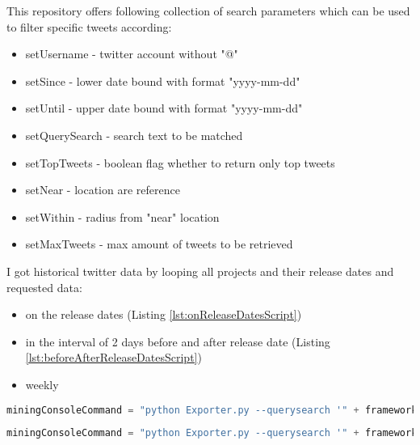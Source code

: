 This repository offers following collection of search parameters which can be used to filter specific tweets according:
\begin{itemize}
  \item setUsername - twitter account without "@"
  \item setSince - lower date bound with format "yyyy-mm-dd"
  \item setUntil - upper date bound with format "yyyy-mm-dd"
  \item setQuerySearch - search text to be matched
  \item setTopTweets - boolean flag whether to return only top tweets
  \item setNear - location are reference 
  \item setWithin - radius from "near" location
  \item setMaxTweets - max amount of tweets to be retrieved
\end{itemize}


I got historical twitter data by looping all projects and their release dates and requested data: 

\begin{itemize}
  \item on the release dates (Listing \ref{lst:onReleaseDatesScript})
  \item in the interval of 2 days before and after  release date (Listing \ref{lst:beforeAfterReleaseDatesScript})
  \item weekly
\end{itemize}


\begin{lstlisting}[caption={Creating command to get Tweets about a project version on release dates},label={lst:onReleaseDatesScript},language=Python]
miningConsoleCommand = "python Exporter.py --querysearch '" + frameworkName + " AND " + version + "' --since " + str(releaseDate) + " --until " + str(afterRelease) + " --output='" + frameworkName + "_" + str(releaseDate) + ".csv" + "'"
\end{lstlisting}


\begin{lstlisting}[caption={Creating command to get Tweets about a project version in particular time interval around release date},label={lst:beforeAfterReleaseDatesScript},language=Python]
miningConsoleCommand = "python Exporter.py --querysearch '" + frameworkName + "' --since " + str(fromDate) + " --until " + str(toDate)  + " --lang " + "en" + " --maxtweets " + str(TWEETS_PER_RELEASE) + " --output='" + frameworkName + ".csv" + "'"
\end{lstlisting}


